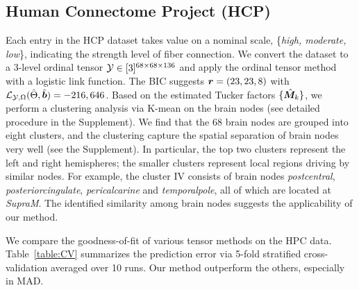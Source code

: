 \documentclass{article}
\theoremstyle{plain}
\theoremstyle{definition}
\begin{document}
\subsection{Human Connectome Project (HCP)}
Each entry in the HCP dataset takes value on a nominal scale, \{{\it high, moderate, low}\}, indicating the strength level of fiber connection. We convert the dataset to a 3-level ordinal tensor $\mathcal{Y}\in[3]^{68\times 68\times 136}$ and apply the ordinal tensor method with a logistic link function. The BIC suggests $\bm{r} = (23,23,8)$ with $\mathcal{L}_{\mathcal{Y},\Omega}(\hat{\Theta},\hat{\bm{b}}) = -216,646$. Based on the estimated Tucker factors $\{\hat {\bm M}_k\}$, we perform a clustering analysis via K-mean on the brain nodes (see detailed procedure in the Supplement). We find that the 68 brain nodes are grouped into eight clusters, and the clustering capture the spatial separation of brain nodes very well (see the Supplement). In particular, the top two clusters represent the left and right hemispheres; the smaller clusters represent local regions driving by similar nodes. For example, the cluster IV consists of brain nodes {\it postcentral}, {\it posteriorcingulate}, {\it pericalcarine} and {\it temporalpole}, all of which are located at {\it SupraM}. The identified similarity among brain nodes suggests the applicability of our method. 

We compare the goodness-of-fit of various tensor methods on the HPC data. Table~\ref{table:CV} summarizes the prediction error via 5-fold stratified cross-validation averaged over 10 runs. Our method outperform the others, especially in MAD. 

\begin{table}[http]
\vspace{-.2cm}
\caption{Comparison of prediction error in the HPC and InCarMusic analyses. Standard errors are reported in parentheses.}\label{table:CV} 
\vspace{-.3cm}
\end{table}
\end{document}
